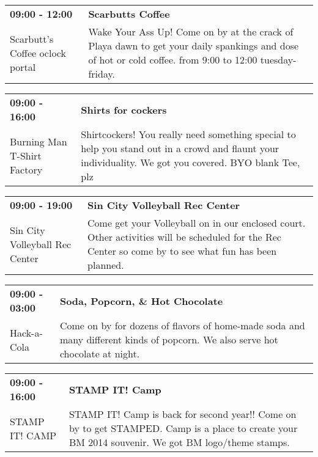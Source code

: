 \begin{tabular}{ p{1in} p{2.2in} }
    \textbf{09:00 - 12:00} & \textbf{Scarbutts Coffee} \\
    Scarbutt's Coffee \newline 9 oclock portal & Wake Your Ass Up! Come on by at the crack of Playa dawn to get your daily spankings and dose of hot or cold coffee. from 9:00 to 12:00 tuesday-friday. \\
    \hline 
\end{tabular}
    
\begin{tabular}{ p{1in} p{2.2in} }
    \textbf{09:00 - 16:00} & \textbf{Shirts for cockers} \\
    Burning Man T-Shirt Factory \newline  & Shirtcockers! You really need something special to help you stand out in a crowd and flaunt your individuality. We got you covered. BYO blank Tee, plz \\
    \hline 
\end{tabular}
    
\begin{tabular}{ p{1in} p{2.2in} }
    \textbf{09:00 - 19:00} & \textbf{Sin City Volleyball Rec Center} \\
    Sin City Volleyball Rec Center \newline  & Come get your Volleyball on in our enclosed court. Other activities will be scheduled for the Rec Center so come by to see what fun has been planned. \\
    \hline 
\end{tabular}
    
\begin{tabular}{ p{1in} p{2.2in} }
    \textbf{09:00 - 03:00} & \textbf{Soda, Popcorn, \& Hot Chocolate} \\
    Hack-a-Cola \newline  & Come on by for dozens of flavors of home-made soda and many different kinds of popcorn. We also serve hot chocolate at night. \\
    \hline 
\end{tabular}
    
\begin{tabular}{ p{1in} p{2.2in} }
    \textbf{09:00 - 16:00} & \textbf{STAMP IT! Camp} \\
    STAMP IT! CAMP \newline  & STAMP IT! Camp is back for second year!! Come on by to get STAMPED. Camp is a place to create your BM 2014 souvenir. We got BM logo/theme stamps. \\
    \hline 
\end{tabular}
    

